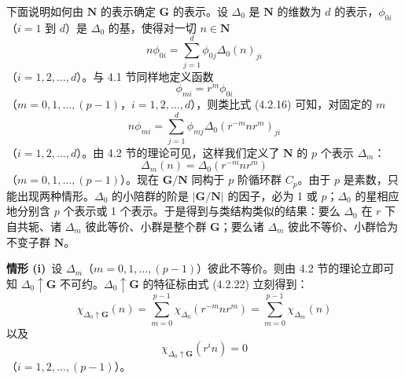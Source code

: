 下面说明如何由 $\mathbf{N}$ 的表示确定 $\mathbf{G}$ 的表示。设 $\Delta_{0}$ 是 $\mathbf{N}$ 的维数为 $d$ 的表示，$\phi_{0i}$（$i = 1$ 到 $d$）是 $\Delta_{0}$ 的基，使得对一切 $n \in \mathbf{N}$
\begin{equation*}
n\phi_{0i} = \sum^{d}_{j=1}\phi_{0j}\Delta_{0}(n)_{ji}
\tag{4.5.18}
\end{equation*}
（$i = 1, 2, \dots, d$）。与 4.1 节同样地定义函数
\begin{equation*}
\phi_{mi} = r^{m}\phi_{0i}
\tag{4.5.19}
\end{equation*}
（$m = 0, 1, \dots, (p-1)$，$i = 1, 2, \dots, d$），则类比式 (4.2.16) 可知，对固定的 $m$
\begin{equation*}
n\phi_{mi} = \sum^{d}_{j=1}\phi_{mj}\Delta_{0}(r^{-m}nr^{m})_{ji}
\tag{4.5.20}
\end{equation*}
（$i = 1, 2, \dots, d$）。由 4.2 节的理论可见，这样我们定义了 $\mathbf{N}$ 的 $p$ 个表示 $\Delta_{m}$：
\begin{equation*}
\Delta_{m}(n) = \Delta_{0}(r^{-m}nr^{m})
\tag{4.5.21}
\end{equation*}
（$m = 0, 1, \dots, (p-1)$）。现在 $\mathbf{G}/\mathbf{N}$ 同构于 $p$ 阶循环群 $C_{p}$。由于 $p$ 是素数，只能出现两种情形。$\Delta_{0}$ 的小陪群的阶是 $|\mathbf{G}/\mathbf{N}|$ 的因子，必为 1 或 $p$；$\Delta_{0}$ 的星相应地分别含 $p$ 个表示或 1 个表示。于是得到与类结构类似的结果：要么 $\Delta_{0}$ 在 $r$ 下自共轭、诸 $\Delta_{m}$ 彼此等价、小群是整个群 $\mathbf{G}$；要么诸 $\Delta_{m}$ 彼此不等价、小群恰为不变子群 $\mathbf{N}$。

\noindent\textbf{情形 (i)}\ 设 $\Delta_{m}$（$m = 0, 1, \dots, (p-1)$）彼此不等价。则由 4.2 节的理论立即可知 $\Delta_{0} \uparrow \mathbf{G}$ 不可约。$\Delta_{0} \uparrow \mathbf{G}$ 的特征标由式 (4.2.22) 立刻得到：
\begin{equation*}
\chi_{\Delta_{0} \uparrow \mathbf{G}}(n) = \sum^{p-1}_{m=0}\chi_{\Delta_{0}}(r^{-m}nr^{m}) = \sum^{p-1}_{m=0}\chi_{\Delta_{m}}(n)
\tag{4.5.22}
\end{equation*}
以及
\begin{equation*}
\chi_{\Delta_{0} \uparrow \mathbf{G}}(r^{i}n) = 0
\tag{4.5.23}
\end{equation*}
（$i = 1, 2, \dots, (p-1)$）。

